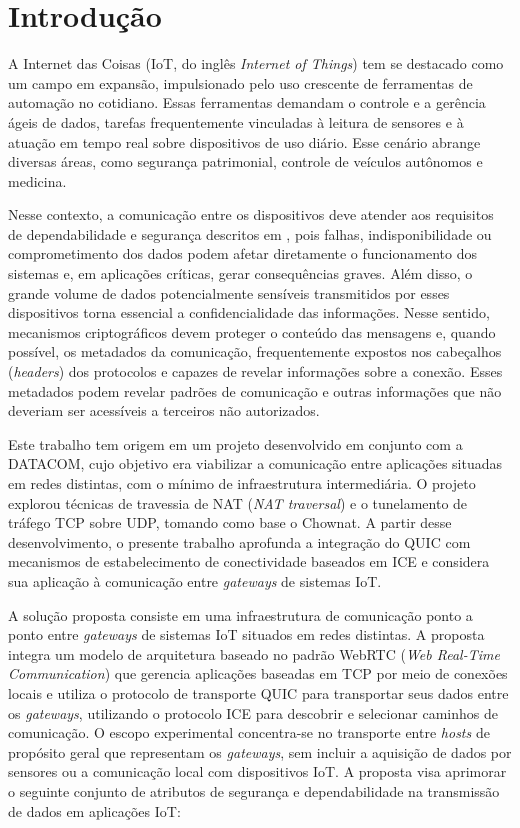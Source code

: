 \chapter{Introdução}
\label{chap:intro}

A Internet das Coisas (IoT, do inglês \textit{Internet of Things}) tem se destacado como um campo em expansão, impulsionado pelo uso crescente de ferramentas de automação no cotidiano. Essas ferramentas demandam o controle e a gerência ágeis de dados, tarefas frequentemente vinculadas à leitura de sensores e à atuação em tempo real sobre dispositivos de uso diário. Esse cenário abrange diversas áreas, como segurança patrimonial, controle de veículos autônomos e medicina.

Nesse contexto, a comunicação entre os dispositivos deve atender aos requisitos de dependabilidade e segurança descritos em \citep{Avizienis2004}, pois falhas, indisponibilidade ou comprometimento dos dados podem afetar diretamente o funcionamento dos sistemas e, em aplicações críticas, gerar consequências graves. Além disso, o grande volume de dados potencialmente sensíveis transmitidos por esses dispositivos torna essencial a confidencialidade das informações. Nesse sentido, mecanismos criptográficos devem proteger o conteúdo das mensagens e, quando possível, os metadados da comunicação, frequentemente expostos nos cabeçalhos (\textit{headers}) dos protocolos e capazes de revelar informações sobre a conexão. Esses metadados podem revelar padrões de comunicação e outras informações que não deveriam ser acessíveis a terceiros não autorizados.

Este trabalho tem origem em um projeto desenvolvido em conjunto com a DATACOM, cujo objetivo era viabilizar a comunicação entre aplicações situadas em redes distintas, com o mínimo de infraestrutura intermediária. O projeto explorou técnicas de travessia de NAT (\textit{NAT traversal}) e o tunelamento de tráfego TCP sobre UDP, tomando como base o Chownat. A partir desse desenvolvimento, o presente trabalho aprofunda a integração do QUIC com mecanismos de estabelecimento de conectividade baseados em ICE e considera sua aplicação à comunicação entre \textit{gateways} de sistemas IoT.

A solução proposta consiste em uma infraestrutura de comunicação ponto a ponto entre \textit{gateways} de sistemas IoT situados em redes distintas. A proposta integra um modelo de arquitetura baseado no padrão WebRTC (\textit{Web Real-Time Communication}) \citep{WebRTCForTheCurious} que gerencia aplicações baseadas em TCP por meio de conexões locais e utiliza o protocolo de transporte QUIC \citep{rfc9000} para transportar seus dados entre os \textit{gateways}, utilizando o protocolo ICE \citep{rfc8445} para descobrir e selecionar caminhos de comunicação. O escopo experimental concentra-se no transporte entre \textit{hosts} de propósito geral que representam os \textit{gateways}, sem incluir a aquisição de dados por sensores ou a comunicação local com dispositivos IoT. A proposta visa aprimorar o seguinte conjunto de atributos de segurança e dependabilidade na transmissão de dados em aplicações IoT:

